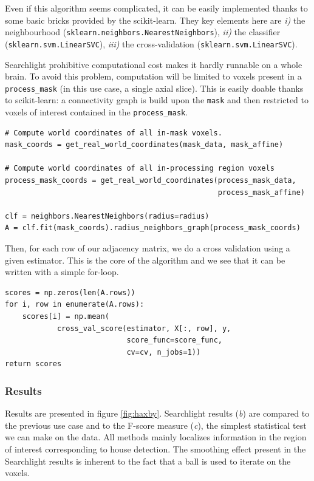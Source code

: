 \documentclass{frontiersSCNS} %
\begin{document}
Even if this algorithm seems complicated, it can be easily implemented thanks to
some basic bricks provided by the scikit-learn. They key elements here are
\textit{i)} the neighbourhood (\texttt{sklearn.neighbors.NearestNeighbors}),
\textit{ii)} the classifier (\texttt{sklearn.svm.LinearSVC}),
\textit{iii)} the cross-validation (\texttt{sklearn.svm.LinearSVC}).

Searchlight prohibitive computational cost makes it hardly runnable on a whole
brain. To avoid this problem, computation will be limited to voxels present in a
\texttt{process\_mask} (in this use case, a single axial slice). This is easily
doable thanks to scikit-learn: a connectivity graph is build upon the
\texttt{mask} and then restricted to voxels of interest contained in the 
\texttt{process\_mask}.

\begin{lstlisting}
# Compute world coordinates of all in-mask voxels.
mask_coords = get_real_world_coordinates(mask_data, mask_affine)

# Compute world coordinates of all in-processing region voxels
process_mask_coords = get_real_world_coordinates(process_mask_data,
                                                 process_mask_affine)

clf = neighbors.NearestNeighbors(radius=radius)
A = clf.fit(mask_coords).radius_neighbors_graph(process_mask_coords)
\end{lstlisting}

Then, for each row of our adjacency matrix, we do a cross validation using a
given estimator. This is the core of the algorithm and we see that it can be
written with a simple for-loop.

\begin{lstlisting}
scores = np.zeros(len(A.rows))
for i, row in enumerate(A.rows):
    scores[i] = np.mean(
            cross_val_score(estimator, X[:, row], y,
                            score_func=score_func,
                            cv=cv, n_jobs=1))
return scores
\end{lstlisting}

\subsubsection{Results}

Results are presented in figure \ref{fig:haxby}. Searchlight results
(\textit{b}) are compared to the previous use case and to the F-score measure
(\textit{c}), the simplest statistical test we can make on the data.
All methods mainly localizes information in the region of
interest corresponding to house detection. The smoothing effect present in the
Searchlight results is inherent to the fact that a ball is used to iterate on
the voxels.
\end{document}
